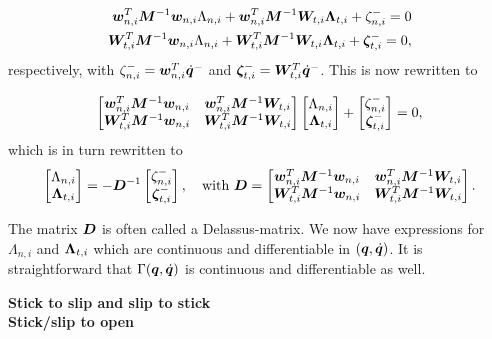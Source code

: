 \documentclass[DC2017114Bouma.tex]{subfiles}
\begin{document}
\begin{align}
{\boldsymbol{w}}_{n,i}^T{\boldsymbol{M}}^{-1}{\boldsymbol{w}}_{n,i}\Lambda_{n,i} + {\boldsymbol{w}}_{n,i}^T{\boldsymbol{M}}^{-1}{\boldsymbol{W}}_{t,i}\boldsymbol{\Lambda}_{t,i} + \zeta_{n,i}^- = 0\\
{\boldsymbol{W}}_{t,i}^T{\boldsymbol{M}}^{-1}{\boldsymbol{w}}_{n,i}\Lambda_{n,i} + {\boldsymbol{W}}_{t,i}^T{\boldsymbol{M}}^{-1}{\boldsymbol{W}}_{t,i}\boldsymbol{\Lambda}_{t,i} + \boldsymbol{\zeta}_{t,i}^- = 0,
\end{align}
respectively, with $\zeta_{n,i}^- = {\boldsymbol{w}}_{n,i}^T\dot{{\boldsymbol{q}}}^-$ and $\boldsymbol{\zeta}_{t,i}^- = {\boldsymbol{W}}_{t,i}^T\dot{{\boldsymbol{q}}}^-$. This is now rewritten to

\begin{align}
\begin{bmatrix}
{\boldsymbol{w}}_{n,i}^T{\boldsymbol{M}}^{-1}{\boldsymbol{w}}_{n,i} & {\boldsymbol{w}}_{n,i}^T{\boldsymbol{M}}^{-1}{\boldsymbol{W}}_{t,i} \\
{\boldsymbol{W}}_{t,i}^T{\boldsymbol{M}}^{-1}{\boldsymbol{w}}_{n,i} & {\boldsymbol{W}}_{t,i}^T{\boldsymbol{M}}^{-1}{\boldsymbol{W}}_{t,i}
\end{bmatrix}
\begin{bmatrix}
\Lambda_{n,i}\\
\boldsymbol{\Lambda}_{t,i}
\end{bmatrix} + \begin{bmatrix}
\zeta_{n,i}^-\\
\boldsymbol{\zeta}_{t,i}^-
\end{bmatrix}
= 0,
\end{align}
which is in turn rewritten to
\begin{align}
\begin{bmatrix}
\Lambda_{n,i}\\
\boldsymbol{\Lambda}_{t,i}
\end{bmatrix} = - {\boldsymbol{D}}^{-1}\begin{bmatrix}
\zeta_{n,i}^-\\
\boldsymbol{\zeta}_{t,i}^-
\end{bmatrix},\quad \text{with } {\boldsymbol{D}} = \begin{bmatrix}
{\boldsymbol{w}}_{n,i}^T{\boldsymbol{M}}^{-1}{\boldsymbol{w}}_{n,i} & {\boldsymbol{w}}_{n,i}^T{\boldsymbol{M}}^{-1}{\boldsymbol{W}}_{t,i} \\
{\boldsymbol{W}}_{t,i}^T{\boldsymbol{M}}^{-1}{\boldsymbol{w}}_{n,i} & {\boldsymbol{W}}_{t,i}^T{\boldsymbol{M}}^{-1}{\boldsymbol{W}}_{t,i}
\end{bmatrix}.
\end{align}

The matrix ${\boldsymbol{D}}$ is often called a Delassus-matrix. We now have expressions for $\Lambda_{n,i}$ and $\boldsymbol{\Lambda}_{t,i}$ which are continuous and differentiable in $({\boldsymbol{q}},\dot{{\boldsymbol{q}}})$. It is straightforward that $\Gamma({\boldsymbol{q}},\dot{{\boldsymbol{q}}})$ is continuous and differentiable as well.

\textbf{Stick to slip and slip to stick}\\

\textbf{Stick/slip to open}\\
\end{document}

